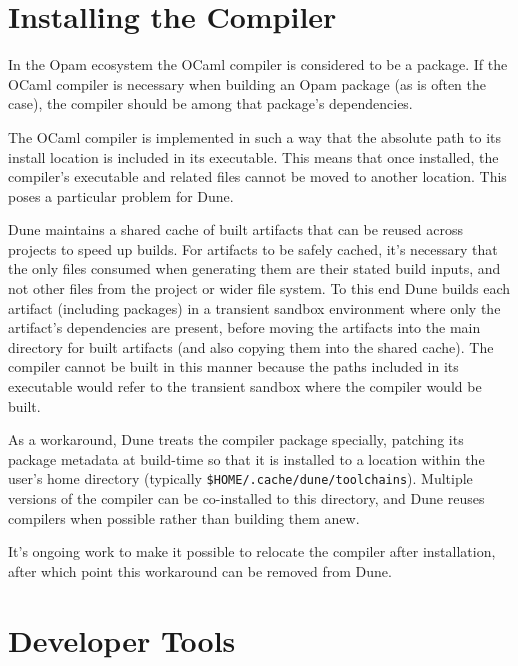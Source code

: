 \documentclass{article}
\begin{document}
\begin{multicols}{2}
        \section {Installing the Compiler}

        In the Opam ecosystem the OCaml compiler is considered to be a
        package. If the OCaml compiler is necessary when building an Opam
        package (as is often the case), the compiler should be
        among that package's dependencies.

        The OCaml compiler is implemented in such a way that the absolute path
        to its install location is included in its executable. This means that
        once installed, the compiler's executable and related files cannot be
        moved to another location. This poses a particular problem for Dune.

        Dune maintains a shared cache of built artifacts that can be reused
        across projects to speed up builds. For artifacts to be safely cached,
        it's necessary that the only files consumed when generating them are
        their stated build inputs, and not other files from the project or wider
        file system. To this end Dune builds each artifact (including packages)
        in a transient sandbox environment where only the artifact's
        dependencies are present, before moving the artifacts into the main
        directory for built artifacts (and also copying them into the shared
        cache). The compiler cannot be built in this manner because the paths
        included in its executable would refer to the transient sandbox where
        the compiler would be built.

        As a workaround, Dune treats the compiler package specially, patching
        its package metadata at build-time so that it is installed to a location
        within the user's home directory (typically
        \texttt{\$HOME/.cache/dune/toolchains}). Multiple versions of the
        compiler can be co-installed to this directory, and Dune reuses
        compilers when possible rather than building them anew.

        It's ongoing work to make it possible to relocate the compiler after
        installation, after which point this workaround can be removed from
        Dune.

        \section {Developer Tools}


\end{multicols}
\end{document}
